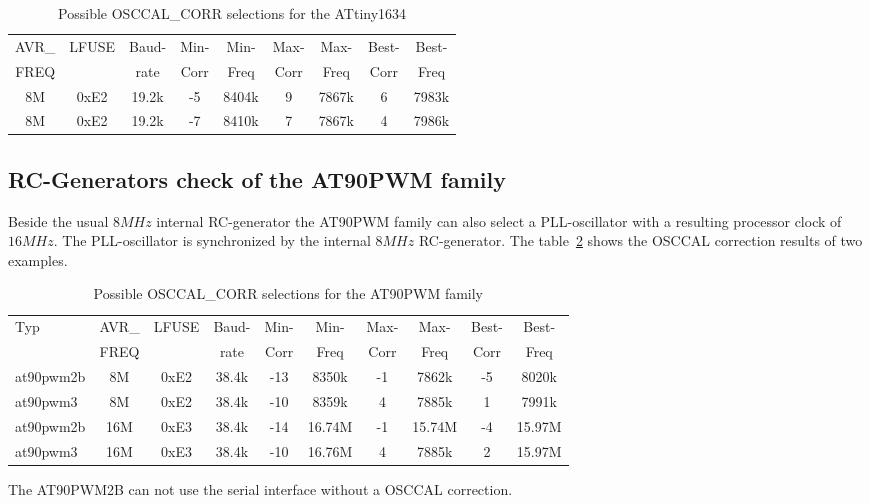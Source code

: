 \begin{table}[H]
  \begin{center}
    \begin{tabular}{| c | c | c || c | c || c | c || c | c |}
    \hline
       AVR\_ & LFUSE & Baud- & Min- & Min- & Max- & Max- & Best- & Best-  \\
       FREQ  &       & rate & Corr & Freq & Corr & Freq  & Corr  & Freq  \\
    \hline
    \hline
         8M & 0xE2  & 19.2k &  -5  & 8404k &  9  & 7867k  & 6  & 7983k \\
         8M & 0xE2  & 19.2k &  -7  & 8410k &  7  & 7867k  & 4  & 7986k \\
    \hline
    \end{tabular}
  \end{center}
  \caption{Possible OSCCAL\_CORR selections for the ATtiny1634}
  \label{tab:tiny1634freq}
\end{table}

\subsection{RC-Generators check of the AT90PWM family}

Beside the usual \(8MHz\) internal RC-generator the AT90PWM family can also
select a PLL-oscillator with a resulting processor clock of \(16MHz\).
The PLL-oscillator is synchronized by the internal \(8MHz\) RC-generator.
The table~\ref{tab:t90pwmfreq} shows the OSCCAL correction results
of two examples.

\begin{table}[H]
  \begin{center}
    \begin{tabular}{| l | c | c | c || c | c || c | c || c | c |}
    \hline
   Typ  &       AVR\_ & LFUSE & Baud- & Min- & Min- & Max- & Max- & Best- & Best-  \\
        &       FREQ  &       & rate & Corr & Freq & Corr & Freq  & Corr  & Freq  \\
    \hline
    \hline
at90pwm2b &         8M & 0xE2  & 38.4k &  -13  & 8350k & -1  & 7862k  & -5  & 8020k \\
    \hline
at90pwm3  &         8M & 0xE2  & 38.4k &  -10  & 8359k &  4  & 7885k  & 1  & 7991k \\
    \hline
at90pwm2b &        16M & 0xE3  & 38.4k &  -14  & 16.74M & -1  & 15.74M  & -4  & 15.97M \\
    \hline
at90pwm3  &        16M & 0xE3  & 38.4k &  -10  & 16.76M &  4  & 7885k  & 2  & 15.97M \\
    \hline
    \end{tabular}
  \end{center}
  \caption{Possible OSCCAL\_CORR selections for the AT90PWM family}
  \label{tab:t90pwmfreq}
\end{table}

The AT90PWM2B can not use the serial interface without a OSCCAL correction.
